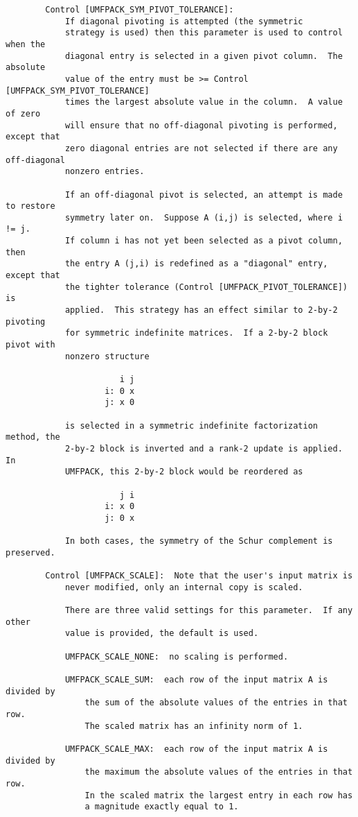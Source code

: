 \documentclass[11pt]{article}
\begin{document}
{\begin{verbatim}
        Control [UMFPACK_SYM_PIVOT_TOLERANCE]:
            If diagonal pivoting is attempted (the symmetric
            strategy is used) then this parameter is used to control when the
            diagonal entry is selected in a given pivot column.  The absolute
            value of the entry must be >= Control [UMFPACK_SYM_PIVOT_TOLERANCE]
            times the largest absolute value in the column.  A value of zero
            will ensure that no off-diagonal pivoting is performed, except that
            zero diagonal entries are not selected if there are any off-diagonal
            nonzero entries.

            If an off-diagonal pivot is selected, an attempt is made to restore
            symmetry later on.  Suppose A (i,j) is selected, where i != j.
            If column i has not yet been selected as a pivot column, then
            the entry A (j,i) is redefined as a "diagonal" entry, except that
            the tighter tolerance (Control [UMFPACK_PIVOT_TOLERANCE]) is
            applied.  This strategy has an effect similar to 2-by-2 pivoting
            for symmetric indefinite matrices.  If a 2-by-2 block pivot with
            nonzero structure

                       i j
                    i: 0 x
                    j: x 0

            is selected in a symmetric indefinite factorization method, the
            2-by-2 block is inverted and a rank-2 update is applied.  In
            UMFPACK, this 2-by-2 block would be reordered as

                       j i
                    i: x 0
                    j: 0 x

            In both cases, the symmetry of the Schur complement is preserved.

        Control [UMFPACK_SCALE]:  Note that the user's input matrix is
            never modified, only an internal copy is scaled.

            There are three valid settings for this parameter.  If any other
            value is provided, the default is used.

            UMFPACK_SCALE_NONE:  no scaling is performed.

            UMFPACK_SCALE_SUM:  each row of the input matrix A is divided by
                the sum of the absolute values of the entries in that row.
                The scaled matrix has an infinity norm of 1.

            UMFPACK_SCALE_MAX:  each row of the input matrix A is divided by
                the maximum the absolute values of the entries in that row.
                In the scaled matrix the largest entry in each row has
                a magnitude exactly equal to 1.


\end{verbatim}}
\end{document}

